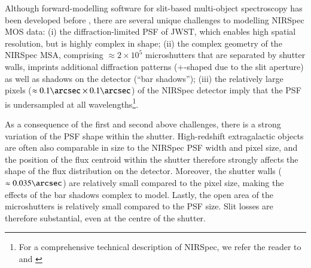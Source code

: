 \documentclass[longauth]{aa}
\begin{document}
Although forward-modelling software for slit-based multi-object spectroscopy has been developed before \citep{Price2016}, there are several unique challenges to modelling NIRSpec MOS data: (i) the diffraction-limited PSF of JWST, which enables high spatial resolution, but is highly complex in shape; (ii) the complex geometry of the NIRSpec MSA, comprising $\approx 2\times 10^5$ microshutters that are separated by shutter walls, imprints additional diffraction patterns ($+$-shaped due to the slit aperture) as well as shadows on the detector (``bar shadows''); (iii) the relatively large pixels ($\approx 0.1\arcsec\times 0.1\arcsec$) of the NIRSpec detector imply that the PSF is undersampled at all wavelengths\footnote{For a comprehensive technical description of NIRSpec, we refer the reader to \citet{Jakobsen2022} and \citet{Ferruit2022}}.

As a consequence of the first and second above challenges, there is a strong variation of the PSF shape within the shutter. High-redshift extragalactic objects are often also comparable in size to the NIRSpec PSF width and pixel size, and the position of the flux centroid within the shutter therefore strongly affects the shape of the flux distribution on the detector. Moreover, the shutter walls ($\approx0.035\arcsec$) are relatively small compared to the pixel size, making the effects of the bar shadows complex to model. Lastly, the open area of the microshutters is relatively small \citep[$\approx 0.2\arcsec \times 0.46\arcsec$;][]{Jakobsen2022} compared to the PSF size. Slit losses are therefore substantial, even at the centre of the shutter.
\end{document}

